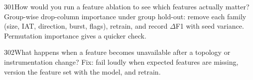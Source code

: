 \begin{qa}{301}{How would you run a feature ablation to see which features actually matter?}
Group-wise drop-column importance under group hold-out: remove each family (size, IAT, direction, burst, flags),
retrain, and record $\Delta$F1 with seed variance. Permutation importance gives a quicker check.
\end{qa}

\begin{qa}{302}{What happens when a feature becomes unavailable after a topology or instrumentation change?}
Fix: fail loudly when expected features are missing, version the feature set with the model, and retrain.
\end{qa}

